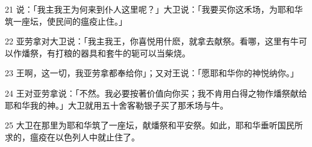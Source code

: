 \par 21 说：「我主我王为何来到仆人这里呢？」大卫说：「我要买你这禾场，为耶和华筑一座坛，使民间的瘟疫止住。」
\par 22 亚劳拿对大卫说：「我主我王，你喜悦用什麽，就拿去献祭。看哪，这里有牛可以作燔祭，有打粮的器具和套牛的轭可以当柴烧。
\par 23 王啊，这一切，我亚劳拿都奉给你」；又对王说：「愿耶和华你的神悦纳你。」
\par 24 王对亚劳拿说：「不然。我必要按著价值向你买；我不肯用白得之物作燔祭献给耶和华我的神。」大卫就用五十舍客勒银子买了那禾场与牛。
\par 25 大卫在那里为耶和华筑了一座坛，献燔祭和平安祭。如此，耶和华垂听国民所求的，瘟疫在以色列人中就止住了。


